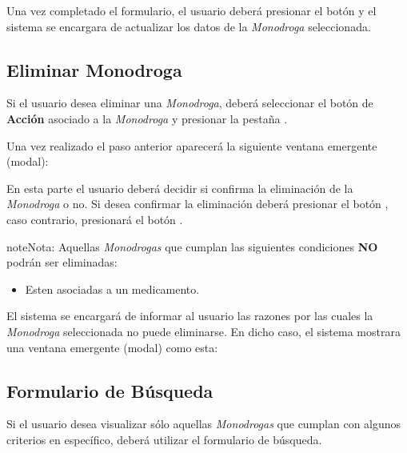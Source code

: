 \documentclass[a4paper,10pt,spanish]{sphinxmanual}
\begin{document}
Una vez completado el formulario, el usuario deberá presionar el botón  y el sistema se encargara de actualizar los datos de la \emph{Monodroga} seleccionada.


\subsection{Eliminar Monodroga}
\label{monodrogas:id3}\label{monodrogas:eliminar-monodroga}
Si el usuario desea eliminar una \emph{Monodroga}, deberá seleccionar el botón de \textbf{Acción} asociado a la \emph{Monodroga} y presionar la pestaña .


Una vez realizado el paso anterior aparecerá la siguiente ventana emergente (modal):


En esta parte el usuario deberá decidir si confirma la eliminación de la \emph{Monodroga} o no. Si desea confirmar la eliminación deberá presionar el botón , caso contrario, presionará el botón .

\begin{notice}{note}{Nota:}
Aquellas \emph{Monodrogas} que cumplan las siguientes condiciones \textbf{NO} podrán ser eliminadas:
\begin{itemize}
\item {} 
Esten asociadas a un medicamento.

\end{itemize}

El sistema se encargará de informar al usuario las razones por las cuales la \emph{Monodroga} seleccionada no puede eliminarse. En dicho caso, el sistema mostrara una ventana emergente (modal) como esta:

\end{notice}


\subsection{Formulario de Búsqueda}
\label{monodrogas:formulario-de-busqueda}\label{monodrogas:formulario-busqueda-monodroga}
Si el usuario desea visualizar sólo aquellas \emph{Monodrogas} que cumplan con algunos criterios en específico, deberá utilizar el formulario de búsqueda.
\end{document}
